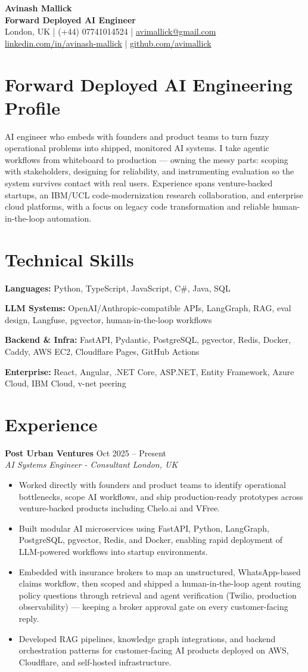 \documentclass[10pt,letterpaper]{article}
\newcommand{\resumeHeader}[6]{
  \begin{center}
    {\fontsize{22}{24}\selectfont\bfseries\color{ink} #1}\\[-1pt]
    {\normalsize\bfseries\color{accent} Forward Deployed AI Engineer}\\[4pt]
    {\small\color{muted} #2 \quad | \quad #3 \quad | \quad \href{mailto:#4}{#4}}\\[-1pt]
    {\small\color{muted} \href{#5}{linkedin.com/in/avinash-mallick} \quad | \quad \href{#6}{github.com/avimallick}}
  \end{center}
  \vspace{-4pt}
}
\newcommand{\role}[4]{
  \vspace{2pt}
  {\bfseries\color{ink} #1} \hfill {\small\color{muted} #2}\\
  {\itshape\color{muted} #3} \hfill {\small\itshape\color{muted} #4}
}
\newcommand{\summary}[1]{
  \begingroup
  \color{ink}
  \linespread{1.03}\selectfont
  #1
  \endgroup
}
\newcommand{\skillrow}[2]{
  \begingroup
  \raggedright
  {\bfseries\color{ink}#1:} #2\par\vspace{2pt}
  \endgroup
}
\begin{document}
\resumeHeader
  {Avinash Mallick}
  {London, UK}
  {(+44) 07741014524}
  {avimallick@gmail.com}
  {https://www.linkedin.com/in/avinash-mallick-b272b6214/}
  {https://github.com/avimallick}

\section*{Forward Deployed AI Engineering Profile}
\summary{AI engineer who embeds with founders and product teams to turn fuzzy operational problems into shipped, monitored AI systems. I take agentic workflows from whiteboard to production --- owning the messy parts: scoping with stakeholders, designing for reliability, and instrumenting evaluation so the system survives contact with real users. Experience spans venture-backed startups, an IBM/UCL code-modernization research collaboration, and enterprise cloud platforms, with a focus on legacy code transformation and reliable human-in-the-loop automation.}

\section*{Technical Skills}
\skillrow{Languages}{Python, TypeScript, JavaScript, C\#, Java, SQL}
\skillrow{LLM Systems}{OpenAI/Anthropic-compatible APIs, LangGraph, RAG, eval design, Langfuse, pgvector, human-in-the-loop workflows}
\skillrow{Backend \& Infra}{FastAPI, Pydantic, PostgreSQL, pgvector, Redis, Docker, Caddy, AWS EC2, Cloudflare Pages, GitHub Actions}
\skillrow{Enterprise}{React, Angular, .NET Core, ASP.NET, Entity Framework, Azure Cloud, IBM Cloud, v-net peering}

\section*{Experience}
\role{Post Urban Ventures}{Oct 2025 -- Present}{AI Systems Engineer - Consultant}{London, UK}
\begin{itemize}
  \item Worked directly with founders and product teams to identify operational bottlenecks, scope AI workflows, and ship production-ready prototypes across venture-backed products including Chelo.ai and VFree.
  \item Built modular AI microservices using FastAPI, Python, LangGraph, PostgreSQL, pgvector, Redis, and Docker, enabling rapid deployment of LLM-powered workflows into startup environments.
  \item Embedded with insurance brokers to map an unstructured, WhatsApp-based claims workflow, then scoped and shipped a human-in-the-loop agent routing policy questions through retrieval and agent verification (Twilio, production observability) --- keeping a broker approval gate on every customer-facing reply.
  \item Developed RAG pipelines, knowledge graph integrations, and backend orchestration patterns for customer-facing AI products deployed on AWS, Cloudflare, and self-hosted infrastructure.
\end{itemize}
\end{document}
